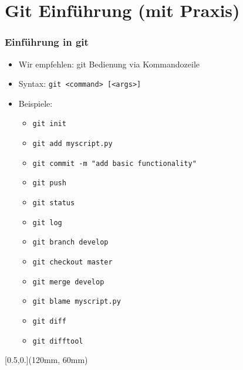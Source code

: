 \documentclass{beamer}
\begin{document}
\section{Git Einführung (mit Praxis)}
\begin{frame}[label=gitintro10]
\frametitle{Einführung in git}
\begin{itemize}
 \item Wir empfehlen: git Bedienung via Kommandozeile
 \item Syntax: \texttt{git <command> [<args>]}
 \item Beispiele:

 \begin{itemize}
  \item \texttt{git init}
  \item \texttt{git add myscript.py}
  \item \texttt{git commit -m "{}add basic functionality"}
  \item \texttt{git push}\\[2mm]
  \pause
  \item \texttt{git status}
  \item \texttt{git log}
  \item \texttt{git branch develop}
  \item \texttt{git checkout master}
  \item \texttt{git merge develop}
  \item \texttt{git blame myscript.py}
  \item \texttt{git diff}
  \item \texttt{git difftool}

 \end{itemize}
\end{itemize}

\begin{textblock*}{\textwidth}[0.5,0.](120mm, 60mm)

\end{textblock*}

\end{frame}
\end{document}
